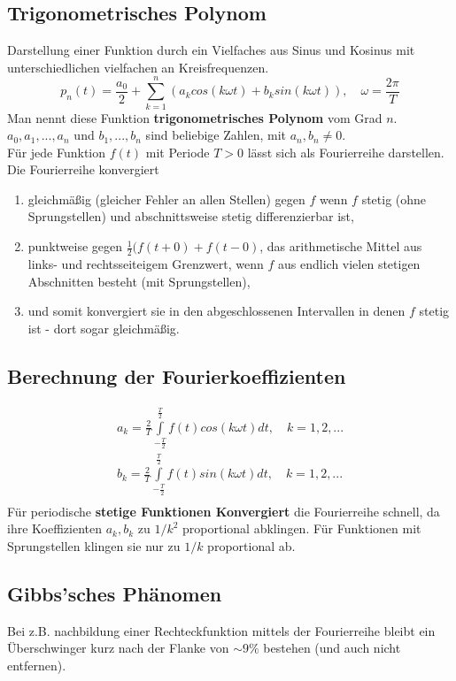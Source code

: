 \documentclass[12pt]{article}
\begin{document}
\subsection{Trigonometrisches Polynom}
Darstellung einer Funktion durch ein Vielfaches aus Sinus und Kosinus mit unterschiedlichen vielfachen an Kreisfrequenzen.
\begin{equation*}
	p_n(t)=\frac{a_0}{2}+\sum\limits_{k=1}^n(a_kcos(k\omega t)+b_ksin(k\omega t)), \quad \omega=\frac{2\pi}{T}
\end{equation*}
Man nennt diese Funktion \textbf{trigonometrisches Polynom} vom Grad $n$. $a_0,a_1,...,a_n$ und $b_1,...,b_n$ sind beliebige Zahlen, mit $a_n, b_n \neq 0$.\\
Für jede Funktion $f(t)$ mit Periode $T>0$ lässt sich als Fourierreihe darstellen.\\
Die Fourierreihe konvergiert
\begin{enumerate}
	\item gleichmäßig (gleicher Fehler an allen Stellen) gegen $f$ wenn $f$ stetig (ohne Sprungstellen) und abschnittsweise stetig differenzierbar ist,
	\item punktweise gegen $\frac{1}{2}(f(t+0)+f(t-0)$, das arithmetische Mittel aus links- und rechtsseiteigem Grenzwert, wenn $f$ aus endlich vielen stetigen Abschnitten besteht (mit Sprungstellen),
	\item und somit konvergiert sie in den abgeschlossenen Intervallen in denen $f$ stetig ist - dort sogar gleichmäßig.
\end{enumerate}
\subsection{Berechnung der Fourierkoeffizienten}
\begin{gather*}
	a_k=\frac{2}{T}\int\limits_{-\frac{T}{2}}^{\frac{T}{2}}f(t)cos(k\omega t)dt, \quad k=1,2,...\\
	b_k=\frac{2}{T}\int\limits_{-\frac{T}{2}}^{\frac{T}{2}}f(t)sin(k\omega t)dt, \quad k=1,2,...\\
\end{gather*}
Für periodische \textbf{stetige Funktionen Konvergiert} die Fourierreihe schnell, da ihre Koeffizienten $a_k,b_k$ zu $1/k^2$ proportional abklingen. Für Funktionen mit Sprungstellen klingen sie nur zu $1/k$ proportional ab.
\subsection{Gibbs'sches Phänomen}
Bei z.B. nachbildung einer Rechteckfunktion mittels der Fourierreihe bleibt ein Überschwinger kurz nach der Flanke von $\sim 9\%$ bestehen (und auch nicht entfernen).
\end{document}
